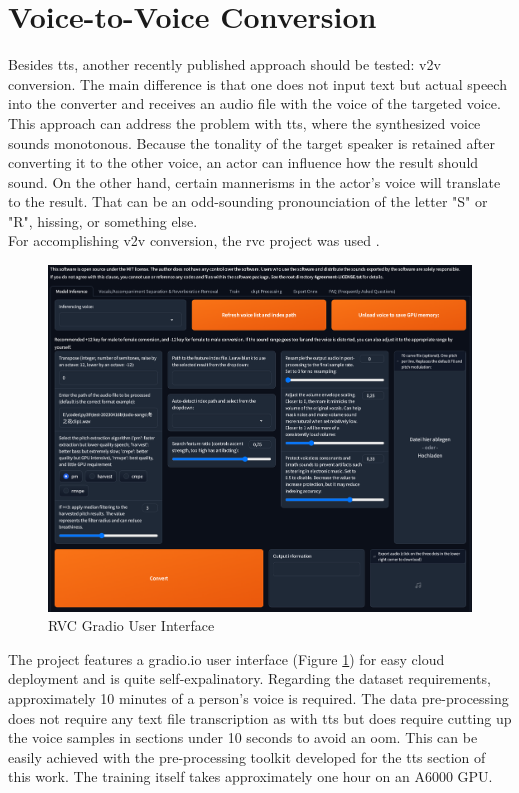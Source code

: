 \documentclass[
  a4paper,  %
  twoside,  %
  bibliography=totoc,
  headsepline,
  cleardoublepage=empty,
  parskip=half,
  draft=false
]{scrbook}
\begin{document}
\section{Voice-to-Voice Conversion}
\label{sec:v2v}
Besides \gls{tts}, another recently published approach should be tested: \gls{v2v} conversion. The main difference is that one does not input text but actual speech into the converter and receives an audio file with the voice of the targeted voice. This approach can address the problem with \gls{tts}, where the synthesized voice sounds monotonous. Because the tonality of the target speaker is retained after converting it to the other voice, an actor can influence how the result should sound. On the other hand, certain mannerisms in the actor's voice will translate to the result. That can be an odd-sounding pronounciation of the letter "S" or "R", hissing, or something else. \\
For accomplishing \gls{v2v} conversion, the \gls{rvc} project was used \cite{RVCProjectRetrievalbasedVoiceConversionWebUI2023}. 

\begin{figure}[h]
  \centering
  \includegraphics[width=1\textwidth]{./graphics/RVC-UI.png}
  \caption{RVC Gradio User Interface}
  \label{fig:rvc-gradio}
\end{figure}

The project features a gradio.io user interface (Figure \ref{fig:rvc-gradio}) for easy cloud deployment and is quite self-expalinatory. Regarding the dataset requirements, approximately 10 minutes of a person's voice is required. The data pre-processing does not require any text file transcription as with \gls{tts} but does require cutting up the voice samples in sections under 10 seconds to avoid an \gls{oom}. This can be easily achieved with the pre-processing toolkit developed for the \gls{tts} section of this work. The training itself takes approximately one hour on an A6000 GPU.
\end{document}
